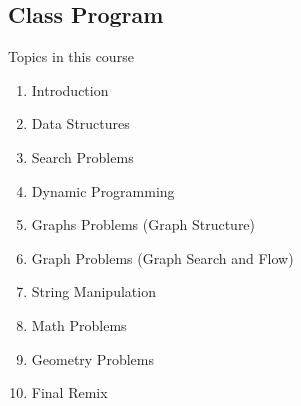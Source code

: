 \subsection{Class Program}
\begin{frame}{Topics in this course}
  \begin{enumerate}
    \item Introduction
    \item Data Structures
    \item Search Problems
    \item Dynamic Programming
    \item Graphs Problems (Graph Structure)
    \item Graph Problems (Graph Search and Flow)
    \item String Manipulation
    \item Math Problems
    \item Geometry Problems
    \item Final Remix
  \end{enumerate}
\end{frame}

